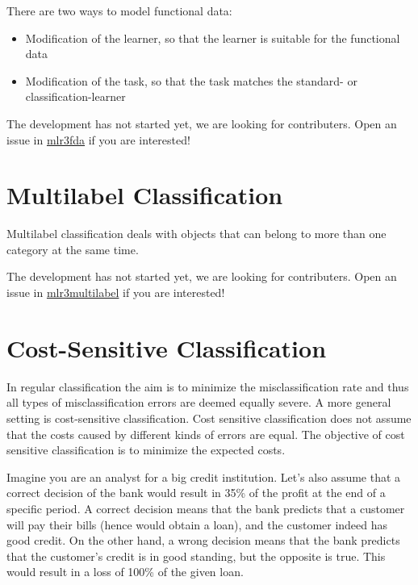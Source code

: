 \documentclass[]{scrbook}
\providecommand{\tightlist}{%
  \setlength{\itemsep}{0pt}\setlength{\parskip}{0pt}}
\begin{document}
There are two ways to model functional data:

\begin{itemize}
\tightlist
\item
  Modification of the learner, so that the learner is suitable for the functional data
\item
  Modification of the task, so that the task matches the standard- or classification-learner
\end{itemize}

The development has not started yet, we are looking for contributers.
Open an issue in \href{https://github.com/mlr-org/mlr3fda}{mlr3fda} if you are interested!

\hypertarget{multilabel}{%
\section{Multilabel Classification}\label{multilabel}}

Multilabel classification deals with objects that can belong to more than one category at the same time.

The development has not started yet, we are looking for contributers.
Open an issue in \href{https://github.com/mlr-org/mlr3multilabel}{mlr3multilabel} if you are interested!

\hypertarget{cost-sens}{%
\section{Cost-Sensitive Classification}\label{cost-sens}}

In regular classification the aim is to minimize the misclassification rate and thus all types of misclassification errors are deemed equally severe.
A more general setting is cost-sensitive classification.
Cost sensitive classification does not assume that the costs caused by different kinds of errors are equal.
The objective of cost sensitive classification is to minimize the expected costs.

Imagine you are an analyst for a big credit institution.
Let's also assume that a correct decision of the bank would result in 35\% of the profit at the end of a specific period.
A correct decision means that the bank predicts that a customer will pay their bills (hence would obtain a loan), and the customer indeed has good credit.
On the other hand, a wrong decision means that the bank predicts that the customer's credit is in good standing, but the opposite is true.
This would result in a loss of 100\% of the given loan.
\end{document}
